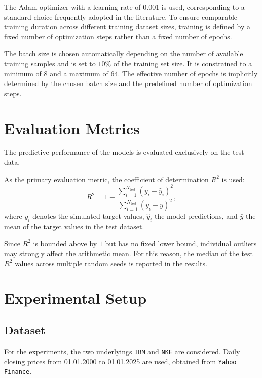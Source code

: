 The Adam optimizer with a learning rate of 0.001 is used, corresponding to a standard choice frequently adopted in the literature.
To ensure comparable training duration across different training dataset sizes, training is defined by a fixed number of optimization steps rather than a fixed number of epochs.

The batch size is chosen automatically depending on the number of available training samples and is set to $10\%$ of the training set size.
It is constrained to a minimum of $8$ and a maximum of $64$.
The effective number of epochs is implicitly determined by the chosen batch size and the predefined number of optimization steps.

\section{Evaluation Metrics}
\label{sec:mt-evaluation-metrics}

The predictive performance of the models is evaluated exclusively on the test data.

As the primary evaluation metric, the coefficient of determination
$R^2$ is used:
\begin{equation}
R^2
=
1 - \frac{\sum_{i=1}^{N_{\text{test}}}(y_i - \hat{y}_i)^2}
{\sum_{i=1}^{N_{\text{test}}}(y_i - \bar{y})^2},
\end{equation}
where $y_i$ denotes the simulated target values,
$\hat{y}_i$ the model predictions, and
$\bar{y}$ the mean of the target values
in the test dataset.

Since $R^2$ is bounded above by $1$ but has no fixed lower bound,
individual outliers may strongly affect the arithmetic mean.
For this reason, the median of the test $R^2$ values
across multiple random seeds is reported in the results.

\section{Experimental Setup}
\label{sec:mt-experimental-setup}

\subsection{Dataset}
\label{sec:mt-dataset}

For the experiments, the two underlyings
\texttt{IBM} and \texttt{NKE} are considered.
Daily closing prices from 01.01.2000 to 01.01.2025 are used,
obtained from \texttt{Yahoo Finance}.

